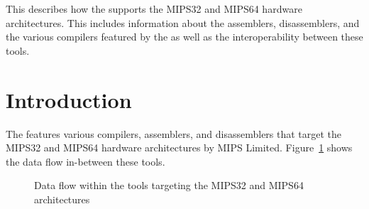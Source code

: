 




\renewcommand{\seemips}{}

{This \documentation{} describes how the \ecs{} supports the MIPS32 and MIPS64 hardware architectures.
This includes information about the assemblers, disassemblers, and the various compilers featured by the \ecs{} as well as the interoperability between these tools.}

\section{Introduction}

The \ecs{} features various compilers, assemblers, and disassemblers that target the MIPS32 and MIPS64 hardware architectures by MIPS Limited.
Figure~\ref{fig:mipsdataflow} shows the data flow in-between these tools.

\begin{figure}
\caption{Data flow within the tools targeting the MIPS32 and MIPS64 architectures}
\label{fig:mipsdataflow}
\end{figure}

